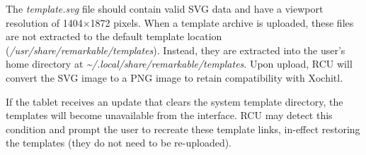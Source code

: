 The \textit{template.svg} file should contain valid SVG data and have a viewport resolution of 1404$\times$1872 pixels. When a template archive is uploaded, these files are not extracted to the default template location (\textit{/usr/share/remarkable/templates}). Instead, they are extracted into the user's home directory at \textit{\textasciitilde/.local/share/remarkable/templates}. Upon upload, RCU will convert the SVG image to a PNG image to retain compatibility with Xochitl.

If the tablet receives an update that clears the system template directory, the templates will become unavailable from the interface. RCU may detect this condition and prompt the user to recreate these template links, in-effect restoring the templates (they do not need to be re-uploaded).
